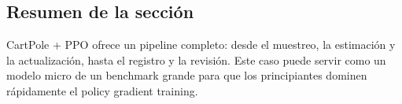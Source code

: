 \subsection{Resumen de la sección}
CartPole + PPO ofrece un pipeline completo: desde el muestreo, la estimación y la actualización, hasta el registro y la revisión. Este caso puede servir como un modelo micro de un benchmark grande para que los principiantes dominen rápidamente el policy gradient training.

